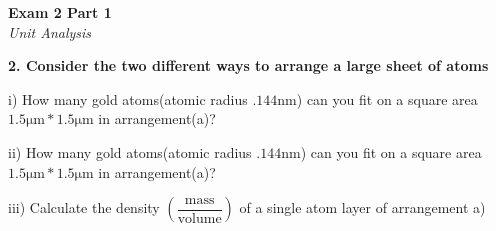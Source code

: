 \documentclass{article}
\begin{document}
    \begin{center}
        \textbf{Exam 2 Part 1}\\
        \textit{Unit Analysis}
    \end{center}
    \textbf{2. Consider the two different ways to arrange a large sheet of atoms}

    i) How many gold atoms(atomic radius $.144 \si{\nano\metre}$) can you fit on a square area $1.5 \si{\micro\metre} * 1.5 \si{\micro\metre}$ in arrangement(a)?

    ii) How many gold atoms(atomic radius $.144 \si{\nano\metre}$) can you fit on a square area $1.5 \si{\micro\metre} * 1.5 \si{\micro\metre}$ in arrangement(a)?

    iii) Calculate the density $(\dfrac{\text{mass}}{\text{volume}})$ of a single atom layer of arrangement a)

    \pagebreak
\end{document}
